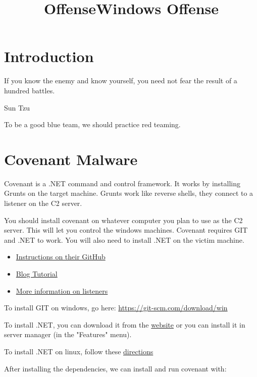\documentclass{article}
\begin{document}
\title{Offense}

\graphicspath{ {./Images/} }

\title{Windows Offense}

\tableofcontents

\section{Introduction}
\epigraph{If you know the enemy and know yourself, you need not fear the result of a hundred battles.}{Sun Tzu}

To be a good blue team, we should practice red teaming.

\section{Covenant Malware}
Covenant is a .NET command and control framework. It works by installing
Grunts on the target machine. Grunts work like reverse shells, they connect to a listener on 
the C2 server.

You should install covenant on whatever computer you
plan to use as the C2 server. This will let you control the windows machines. 
Covenant requires GIT and .NET to work. 
You will also need to install .NET on the victim machine.

\begin{itemize}
        \item\href{https://github.com/cobbr/Covenant/wiki/Installation-And-Startup}{Instructions on their GitHub}
        \item \href{https://blog.netwrix.com/2022/12/16/covenant-c2-tutorial/}{Blog Tutorial}
        \item \href{https://github.com/cobbr/Covenant-wiki/blob/master/Listeners.md}{More information on listeners}
\end{itemize}

To install GIT on windows, go here:
\href{https://git-scm.com/download/win}{https://git-scm.com/download/win}

To install .NET, you can download it from the
\href{https://dotnet.microsoft.com/en-us/download}{website} or you can install it in server manager (in the "Features" menu).

To install .NET on linux, follow these 
\href{https://learn.microsoft.com/en-us/dotnet/core/install/linux-scripted-manual#scripted-install}{directions}


After installing the dependencies, we can install and run covenant with:
\end{document}
